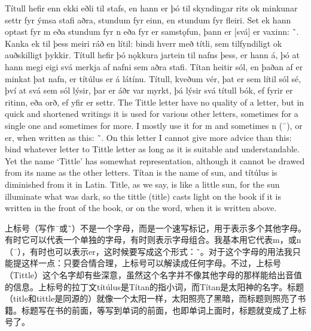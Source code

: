 \begin{paracol}{2}
    Títull hefir enn ekki eðli til stafs, en hann er þó til skyndingar rits ok minkunar settr fyr ýmsa stafi aðra, stundum fyr einn, en stundum fyr fleiri. Set ek hann optast fyr m eða stundum fyr n eða fyr er samstǫfun, þann er [svá] er vaxinn: ˜. Kanka ek til þess meiri ráð en lítil: bindi hverr með títli, sem tilfyndiligt ok auðskilligt þykkir. Títull hefir þó nǫkkura jartein til nafns þess, er hann á, þó at hann megi eigi svá merkja af nafni sem aðra stafi. Títan heitir sól, en þaðan af er minkat þat nafn, er títúlus er á látínu. Títull, kveðum vér, þat er sem lítil sól sé, því at svá sem sól lýsir, þar er áðr var myrkt, þá lýsir svá títull bók, ef fyrir er ritinn, eða orð, ef yfir er settr.
    \switchcolumn
    The Tittle letter have no quality of a letter, but in quick and shortened writings it is used for various other letters, sometimes for a single one and sometimes for more. I mostly use it for m and sometimes n (¯), or er, when written as this: ˜. On this letter I cannot give more advice than this: bind whatever letter to Tittle letter as long as it is suitable and understandable. Yet the name `Tittle' has somewhat representation, although it cannot be drawed from its name as the other letters. Títan is the name of sun, and títúlus is diminished from it in Latin. Title, as we say, is like a little sun, for the sun illuminate what was dark, so the tittle (title) casts light on the book if it is written in the front of the book, or on the word, when it is written above.
\end{paracol}
\begin{translation*}{}
    上标号（写作¯或˜）不是一个字母，而是一个速写标记，用于表示多个其他字母。有时它可以代表一个单独的字母，有时则表示字母组合。我基本用它代表m，或n（¯），有时也可以表示er，这时候要写成这个形式：˜。对于这个字母的用法我只能提这样一点：只要合情合理，上标号可以解读成任何字母。不过，上标号（Tittle）这个名字却有些深意，虽然这个名字并不像其他字母的那样能给出音值的信息。上标号的拉丁文títúlus是Títan的指小词，而Títan是太阳神的名字。标题（title和tittle是同源的）就像一个太阳一样，太阳照亮了黑暗，而标题则照亮了书籍。标题写在书的前面，等写到单词的前面，也即单词上面时，标题就变成了上标号了。
\end{translation*}

